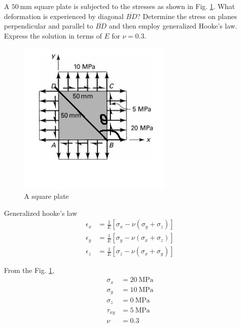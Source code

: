 \section{}

A $\qty{50}{\milli\meter}$ square plate is subjected to the stresses as shown in Fig. \ref{fig:fig4}. What deformation is
experienced by diagonal $\overline{BD}$? Determine the stress on planes perpendicular and parallel to $\overline{BD}$
and then employ generalized Hooke's law. Express the solution in terms of $E$ for $\nu = 0.3$.

\begin{figure}[h]
    \centering
    \includegraphics[width=0.3\linewidth]{Questions/Figures/Q6ProblemDiagram.png}
    \caption{A square plate}
    \label{fig:fig4}
\end{figure}

Generalized hooke's law
\begin{align*}
    \epsilon_x &= \frac{1}{E}[\sigma_x - \nu(\sigma_y + \sigma_z)] \\
    \epsilon_y &= \frac{1}{E}[\sigma_y - \nu(\sigma_x + \sigma_z)] \\
    \epsilon_z &= \frac{1}{E}[\sigma_z - \nu(\sigma_x + \sigma_y)]
\end{align*}

From the Fig. \ref{fig:fig4},
\begin{align*}
    \sigma_x &= \qty{20}{\mega\pascal} \\
    \sigma_y &= \qty{10}{\mega\pascal} \\
    \sigma_z &= \qty{0}{\mega\pascal} \\
    \tau_{xy} &= \qty{5}{\mega\pascal} \\
    \nu &= 0.3 \\
\end{align*}

